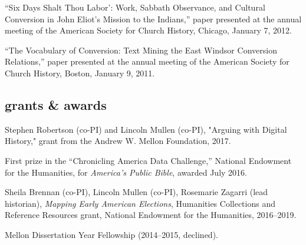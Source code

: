 \documentclass[11pt]{article}
\begin{document}
``Six Days Shalt Thou Labor': Work, Sabbath Observance, and Cultural
Conversion in John Eliot's Mission to the Indians,'' paper presented at
the annual meeting of the American Society for Church History, Chicago,
January 7, 2012.

``The Vocabulary of Conversion: Text Mining the East Windsor Conversion
Relations,'' paper presented at the annual meeting of the American
Society for Church History, Boston, January 9, 2011.



% 

\subsection{grants \& awards}\label{grants-awards}

Stephen Robertson (co-PI) and Lincoln Mullen (co-PI), "Arguing with Digital 
History," grant from the Andrew W. Mellon Foundation, 2017.

First prize in the ``Chronicling America Data Challenge,'' National Endowment 
for the Humanities, for \emph{America's Public Bible}, awarded July 2016.

Sheila Brennan (co-PI), Lincoln Mullen (co-PI), Rosemarie Zagarri (lead 
historian), \emph{Mapping Early American Elections}, Humanities Collections 
and Reference Resources grant, National Endowment for the Humanities, 
2016--2019.

Mellon Dissertation Year Fellowship (2014--2015, declined).
\end{document}
